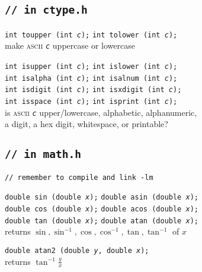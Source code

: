 \documentclass[8pt]{article}
\newcommand{\Cc}[1]{\texttt{#1}}
\newcommand{\cmt}[1]{\textcolor[gray]{.3}{\texttt{#1}}} %
\newcommand{\ty}[1]{\textcolor{blue!80}{\texttt{#1}}} %
\newcommand{\fn}[1]{\texttt{#1}} %
\newcommand{\var}[1]{\texttt{\textit{#1}}} %
\newcommand{\htab}{\hspace*{2em}} %
\begin{document}
\begin{multicols}{3}
\subsection*{\Cc{\cmt{// in ctype.h}}}

\Cc{\ty{int} \fn{toupper}\,(\ty{int} \var{c});} \hfill
\Cc{\ty{int} \fn{tolower}\,(\ty{int} \var{c});} \\
\htab make \textsc{ascii} \var{c} uppercase or lowercase

\Cc{\ty{int} \fn{isupper}\,(\ty{int} \var{c});} \hfill
\Cc{\ty{int} \fn{islower}\,(\ty{int} \var{c});} \\
\Cc{\ty{int} \fn{isalpha}\,(\ty{int} \var{c});} \hfill
\Cc{\ty{int} \fn{isalnum}\,(\ty{int} \var{c});} \\
\Cc{\ty{int} \fn{isdigit}\,(\ty{int} \var{c});} \hfill
\Cc{\ty{int} \fn{isxdigit}\,(\ty{int} \var{c});} \\
\Cc{\ty{int} \fn{isspace}\,(\ty{int} \var{c});} \hfill
\Cc{\ty{int} \fn{isprint}\,(\ty{int} \var{c});} \\
\htab is \textsc{ascii} \var{c} upper/lowercase, alphabetic, alphanumeric, \\
\htab a digit, a hex digit, whitespace, or printable?

\subsection*{\Cc{\cmt{// in math.h}}}
\Cc{\cmt{// remember to compile and link -lm}}

\Cc{\ty{double} \fn{sin}\,(\ty{double} \var{x});} \hfill
\Cc{\ty{double} \fn{asin}\,(\ty{double} \var{x});} \\
\Cc{\ty{double} \fn{cos}\,(\ty{double} \var{x});} \hfill
\Cc{\ty{double} \fn{acos}\,(\ty{double} \var{x});} \\
\Cc{\ty{double} \fn{tan}\,(\ty{double} \var{x});} \hfill
\Cc{\ty{double} \fn{atan}\,(\ty{double} \var{x});} \\
\htab returns $\sin,\sin^{-1},\cos,\cos^{-1},\tan,\tan^{-1}$ of $x$

\Cc{\ty{double} \fn{atan2}\,(\ty{double} \var{y}, \ty{double} \var{x});} \\
\htab returns $\tan^{-1} \frac{y}{x}$



\end{multicols}
\end{document}
